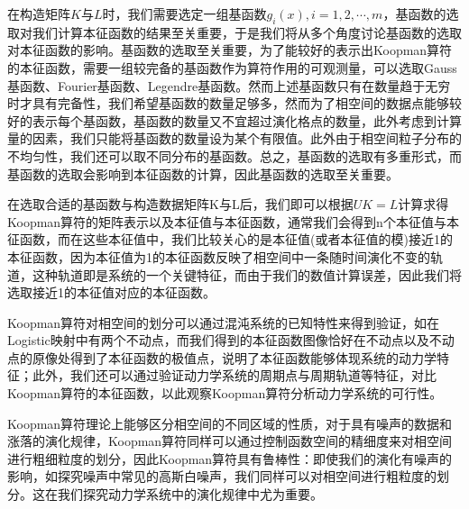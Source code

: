 

在构造矩阵$K$与$L$时，我们需要选定一组基函数${g_i(x)},i=1,2,\cdots,m$，基函数的选取对我们计算本征函数的结果至关重要，于是我们将从多个角度讨论基函数的选取对本征函数的影响。基函数的选取至关重要，为了能较好的表示出Koopman算符的本征函数，需要一组较完备的基函数作为算符作用的可观测量，可以选取Gauss基函数、Fourier基函数、Legendre基函数。然而上述基函数只有在数量趋于无穷时才具有完备性，我们希望基函数的数量足够多，然而为了相空间的数据点能够较好的表示每个基函数，基函数的数量又不宜超过演化格点的数量，此外考虑到计算量的因素，我们只能将基函数的数量设为某个有限值。此外由于相空间粒子分布的不均匀性，我们还可以取不同分布的基函数。总之，基函数的选取有多重形式，而基函数的选取会影响到本征函数的计算，因此基函数的选取至关重要。

在选取合适的基函数与构造数据矩阵K与L后，我们即可以根据$UK=L$计算求得Koopman算符的矩阵表示以及本征值与本征函数，通常我们会得到n个本征值与本征函数，而在这些本征值中，我们比较关心的是本征值(或者本征值的模)接近1的本征函数，因为本征值为1的本征函数反映了相空间中一条随时间演化不变的轨道，这种轨道即是系统的一个关键特征，而由于我们的数值计算误差，因此我们将选取接近1的本征值对应的本征函数。

Koopman算符对相空间的划分可以通过混沌系统的已知特性来得到验证，如在Logistic映射中有两个不动点，而我们得到的本征函数图像恰好在不动点以及不动点的原像处得到了本征函数的极值点，说明了本征函数能够体现系统的动力学特征；此外，我们还可以通过验证动力学系统的周期点与周期轨道等特征，对比Koopman算符的本征函数，以此观察Koopman算符分析动力学系统的可行性。

Koopman算符理论上能够区分相空间的不同区域的性质，对于具有噪声的数据和涨落的演化规律，Koopman算符同样可以通过控制函数空间的精细度来对相空间进行粗细粒度的划分，因此Koopman算符具有鲁棒性：即使我们的演化有噪声的影响，如探究噪声中常见的高斯白噪声，我们同样可以对相空间进行粗粒度的划分。这在我们探究动力学系统中的演化规律中尤为重要。

